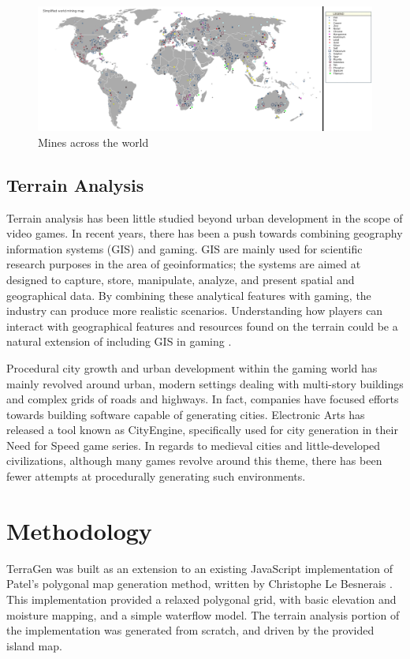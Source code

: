 \begin{figure}
\includegraphics[width=\textwidth]{mining.png}
\caption{Mines across the world}
\end{figure}

\subsection{Terrain Analysis}
Terrain analysis has been little studied beyond urban development in the scope of video games. In recent years, there has been a push towards combining geography information systems (GIS) and gaming. GIS are mainly used for scientific research purposes in the area of geoinformatics; the systems are aimed at designed to capture, store, manipulate, analyze, and present spatial and geographical data. By combining these analytical features with gaming, the industry can produce more realistic scenarios. Understanding how players can interact with geographical features and resources found on the terrain could be a natural extension of including GIS in gaming \cite{Borneman:2011:Online}. 

Procedural city growth and urban development within the gaming world has mainly revolved around urban, modern settings dealing with multi-story buildings and complex grids of roads and highways. In fact, companies have focused efforts towards building software capable of generating cities. Electronic Arts has released a tool known as CityEngine, specifically used for city generation in their Need for Speed game series\cite{10.1109/MCG.2008.58}. In regards to medieval cities and little-developed civilizations, although many games revolve around this theme, there has been fewer attempts at procedurally generating such environments.  

\section{Methodology}

TerraGen was built as an extension to an existing JavaScript implementation of Patel's polygonal map generation method, written by Christophe Le Besnerais \cite{LeBesnec:2015:Online}. This implementation provided a relaxed polygonal grid, with basic elevation and moisture mapping, and a simple waterflow model. The terrain analysis portion of the implementation was generated from scratch, and driven by the provided island map.

